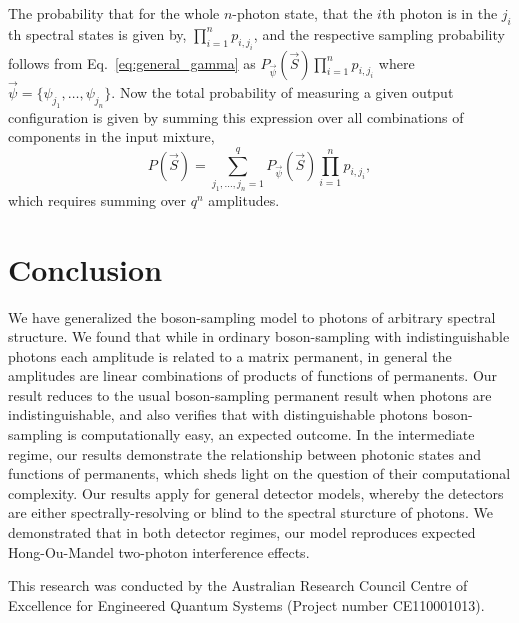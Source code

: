 \documentclass[aps,pra,twocolumn,amsmath,amssymb,nofootinbib,superscriptaddress]{revtex4}
\begin{document}
The probability that for the whole $n$-photon state, that the $i$th photon is in the $j_i$th spectral states is given by, \mbox{$\prod_{i=1}^n p_{i,j_i}$}, and the respective sampling probability follows from Eq.~\ref{eq:general_gamma} as \mbox{$P_{\vec\psi}(\vec{S}) \prod_{i=1}^n p_{i,j_i}$} where \mbox{$\vec\psi = \{\psi_{j_1},\dots,\psi_{j_n}\}$}. Now the total probability of measuring a given output configuration is given by summing this expression over all combinations of components in the input mixture,
\begin{equation}
P(\vec{S}) = \sum_{j_1,\dots,j_n=1}^q P_{\vec\psi}(\vec{S}) \prod_{i=1}^n p_{i,j_i},
\end{equation}
which requires summing over $q^n$ amplitudes.

%
%

\section{Conclusion}

We have generalized the boson-sampling model to photons of arbitrary spectral structure. We found that while in ordinary boson-sampling with indistinguishable photons each amplitude is related to a matrix permanent, in general the amplitudes are linear combinations of products of functions of permanents. Our result reduces to the usual boson-sampling permanent result when photons are indistinguishable, and also verifies that with distinguishable photons boson-sampling is computationally easy, an expected outcome. In the intermediate regime, our results demonstrate the relationship between photonic states and functions of permanents, which sheds light on the question of their computational complexity. Our results apply for general detector models, whereby the detectors are either spectrally-resolving or blind to the spectral sturcture of photons. We demonstrated that in both detector regimes, our model reproduces expected Hong-Ou-Mandel two-photon interference effects.

%
%

\begin{acknowledgments}
This research was conducted by the Australian Research Council Centre of Excellence for Engineered Quantum Systems (Project number CE110001013).
\end{acknowledgments}

%
%


\end{document}
